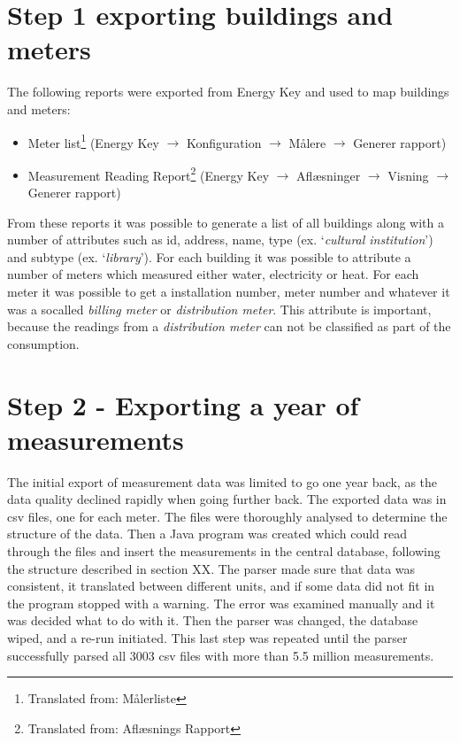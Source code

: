 \section*{Step 1 exporting buildings and meters}
The following reports were exported from Energy Key and used to map buildings and meters:
\begin{itemize}
\item Meter list\footnote{Translated from: Målerliste}  (Energy Key $\rightarrow$ Konfiguration $\rightarrow$ Målere $\rightarrow$ Generer rapport)
\item Measurement Reading Report\footnote{Translated from: Aflæsnings Rapport} (Energy Key $\rightarrow$ Aflæsninger $\rightarrow$ Visning $\rightarrow$ Generer rapport)
\end{itemize}
From these reports it was possible to generate a list of all buildings along with a number of attributes such as id, address, name, type (ex. ‘\emph{cultural institution}’) and subtype (ex. ‘\emph{library}’). For each building it was possible to attribute a number of meters which measured either water, electricity or heat. For each meter it was possible to get a installation number, meter number and whatever it was a socalled \emph{billing meter} or \emph{distribution meter}. This attribute is important, because the readings from a \emph{distribution meter} can not be classified as part of the consumption.
\section*{Step 2 - Exporting a year of measurements}
The initial export of measurement data was limited to go one year back, as the data quality declined rapidly when going further back. The exported data was in csv files, one for each meter. The files were thoroughly analysed to determine the structure of the data. Then a Java program was created which could read through the files and insert the measurements in the central database, following the structure described in section XX. The parser made sure that data was consistent, it translated between different units, and if some data did not fit in the program stopped with a warning. The error was examined manually and it was decided what to do with it. Then the parser was changed, the database wiped, and a re-run initiated. This last step was repeated until the parser successfully parsed all 3003 csv files with more than 5.5 million measurements. 

